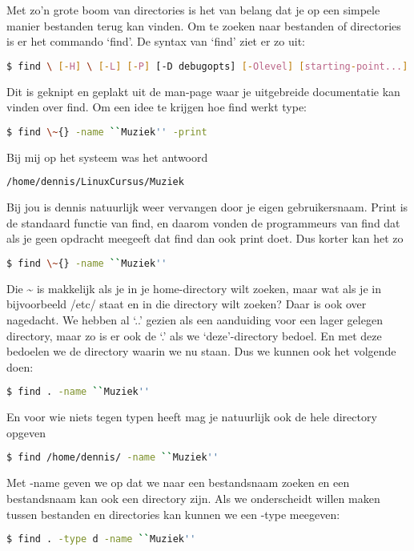Met zo'n grote boom van directories is het van belang dat je op een simpele manier bestanden terug kan vinden. Om te
zoeken naar bestanden of directories is er het commando `find'. De syntax van `find' ziet er zo uit:

\begin{lstlisting}[language=bash]
$ find \ [-H] \ [-L] [-P] [-D debugopts] [-Olevel] [starting-point...] [expression]
\end{lstlisting}

Dit is geknipt en geplakt uit de man-page waar je uitgebreide documentatie kan vinden over find. Om een idee te krijgen
hoe find werkt type:

\begin{lstlisting}[language=bash]
$ find \~{} -name ``Muziek'' -print
\end{lstlisting}

Bij mij op het systeem was het antwoord
\begin{lstlisting}[language=bash]
/home/dennis/LinuxCursus/Muziek
\end{lstlisting}

Bij jou is dennis natuurlijk weer vervangen door je eigen gebruikersnaam. Print is de standaard functie van find, en
daarom vonden de programmeurs van find dat als je geen opdracht meegeeft dat find dan ook print doet. Dus korter kan
het zo
\begin{lstlisting}[language=bash]
$ find \~{} -name ``Muziek''
\end{lstlisting}

Die \~{} is makkelijk als je in je home-directory wilt zoeken, maar wat als je in bijvoorbeeld /etc/ staat en in die
directory wilt zoeken? Daar is ook over nagedacht. We hebben al `..' gezien als een aanduiding voor een lager gelegen
directory, maar zo is er ook de `.' als we `deze'-directory bedoel. En met deze bedoelen we de directory waarin we nu
staan. Dus we kunnen ook het volgende doen:

\begin{lstlisting}[language=bash]
$ find . -name ``Muziek''
\end{lstlisting}

En voor wie niets tegen typen heeft mag je natuurlijk ook de hele directory opgeven
\begin{lstlisting}[language=bash]
$ find /home/dennis/ -name ``Muziek''
\end{lstlisting}

Met -name geven we op dat we naar een bestandsnaam zoeken en een bestandsnaam kan ook een directory zijn. Als we
onderscheidt willen maken tussen bestanden en directories kan kunnen we een -type meegeven:
\begin{lstlisting}[language=bash]
$ find . -type d -name ``Muziek''
\end{lstlisting}

